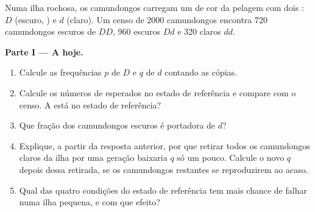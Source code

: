 \begin{problem}
\label{pb:g12:selection-drift-speciation:1}
Numa ilha rochosa, os camundongos carregam um  de cor da pelagem
com dois : $D$ (escuro, ) e $d$ (claro). Um censo de
2000 camundongos encontra 720 camundongos escuros de  $DD$,
960 escuros $Dd$ e 320 claros $dd$.

\medskip
\noindent\textbf{Parte I --- A  hoje.}
\begin{enumerate}
  \item Calcule as frequências $p$ de $D$ e $q$ de $d$ contando as cópias.
  \item Calcule os números de  esperados no estado de
        referência e compare com o censo. A  está no estado de
        referência?
  \item Que fração dos camundongos escuros é portadora de $d$?
  \item Explique, a partir da resposta anterior, por que retirar todos
        os camundongos claros da ilha por uma geração baixaria $q$ só um
        pouco. Calcule o novo $q$ depois dessa retirada, se os
        camundongos restantes se reproduzirem ao acaso.
  \item Qual das quatro condições do estado de referência tem mais
        chance de falhar numa ilha pequena, e com que efeito?
\end{enumerate}


\end{problem}
